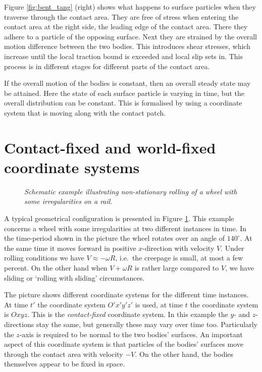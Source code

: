 \documentclass[12pt]{report}
\begin{document}
Figure \ref{fig:bent_tang} (right) shows what happens to surface particles
when they traverse through the contact area. They are free of stress when
entering the contact area at the right side, the leading edge of the
contact area. There they adhere to a particle of the opposing surface. Next
they are strained by the overall motion difference between the two bodies.
This introduces shear stresses, which increase until the local traction
bound is exceeded and local slip sets in. This process is in different
stages for different parts of the contact area.

If the overall motion of the bodies is constant, then an overall steady
state may be attained. Here the state of each surface particle is varying
in time, but the overall distribution can be constant. This is formalised
by using a coordinate system that is moving along with the contact patch.

\section{Contact-fixed and world-fixed coordinate systems}
\label{sec:coordsys}

\begin{figure}[bt]
\centering
{}
\caption{\em Schematic example illustrating non-stationary rolling of a
wheel with some irregularities on a rail.}
\label{fig:moving_coordsys}
\end{figure}

A typical geometrical configuration is presented in Figure
\ref{fig:moving_coordsys}. This example concerns a wheel with some
irregularities at two different instances in time. In the time-period shown
in the picture the wheel rotates over an angle of $140^\circ$. At the same
time it moves forward in positive $x$-direction with velocity $V$. Under
rolling conditions we have $V\approx -\omega R$, i.e.\ the creepage is
small, at most a few percent. On the other hand when $V+\omega R$ is
rather large compared to $V$, we have sliding or `rolling with sliding'
circumstances.

The picture shows different coordinate systems for the different time
instances. At time $t'$ the coordinate system $O'x'y'z'$ is used, at time $t$
the coordinate system is $Oxyz$. This is the {\em contact-fixed\/}
coordinate system. In this example the $y$- and $z$-directions stay the same,
but generally these may vary over time too. Particularly the $z$-axis is
required to be normal to the two bodies' surfaces. An important aspect of
this coordinate system is that particles of the bodies' surfaces move
through the contact area with velocity $-V$. On the other hand, the
bodies themselves appear to be fixed in space.
\end{document}
